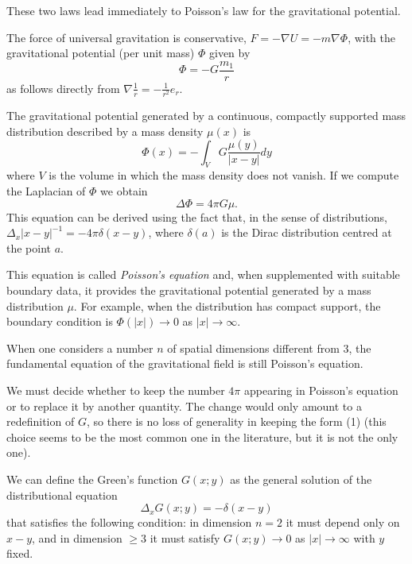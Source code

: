 \begin{points}
\item These two laws lead immediately to Poisson's law for the gravitational potential.

\item The force of universal gravitation is conservative, $F=-\nabla U=-m\nabla\Phi$, with the gravitational potential (per unit mass) $\Phi$ given by
\[
  \Phi=-G\frac{m_1}{r}
\]
as follows directly from $\nabla\frac1r=-\frac{1}{r^2}e_r$.

\item The gravitational potential generated by a continuous, compactly supported mass distribution described by a mass density $\mu(x)$ is
\[
  \Phi(x)=-\int_VG\frac{\mu(y)}{|x-y|}dy
\]
where $V$ is the volume in which the mass density does not vanish. If we compute the Laplacian of $\Phi$ we obtain
\begin{equation}
  \Delta\Phi=4\pi G\mu .
\end{equation}
This equation can be derived using the fact that, in the sense of distributions, $\Delta_x|x-y|^{-1}=-4\pi\delta(x-y)$, where $\delta(a)$ is the Dirac distribution centred at the point $a$.

\item This equation is called \emph{Poisson's equation} and, when supplemented with suitable boundary data, it provides the gravitational potential generated by a mass distribution $\mu$. For example, when the distribution has compact support, the boundary condition is $\Phi(|x|)\to0$ as $|x|\to\infty$.

\item When one considers a number $n$ of spatial dimensions different from 3, the fundamental equation of the gravitational field is still Poisson's equation.

\item We must decide whether to keep the number $4\pi$ appearing in Poisson's equation or to replace it by another quantity. The change would only amount to a redefinition of $G$, so there is no loss of generality in keeping the form (1) (this choice seems to be the most common one in the literature, but it is not the only one).

\item We can define the Green's function $G(x;y)$ as the general solution of the distributional equation
\[
  \Delta_xG(x;y)=-\delta(x-y)
\]
that satisfies the following condition: in dimension $n=2$ it must depend only on $x-y$, and in dimension $\geq3$ it must satisfy $G(x;y)\to0$ as $|x|\to\infty$ with $y$ fixed.


\end{points}

